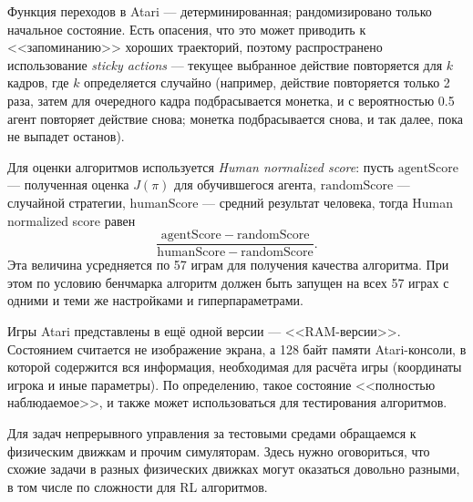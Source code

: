 \begin{example}
Функция переходов в Atari --- детерминированная; рандомизировано только начальное состояние. Есть опасения, что это может приводить к <<запоминанию>> хороших траекторий, поэтому распространено использование \emph{sticky actions} --- текущее выбранное действие повторяется для $k$ кадров, где $k$ определяется случайно (например, действие повторяется только 2 раза, затем для очередного кадра подбрасывается монетка, и с вероятностью 0.5 агент повторяет действие снова; монетка подбрасывается снова, и так далее, пока не выпадет останов).

Для оценки алгоритмов используется \emph{Human normalized score}: пусть $\mathrm{agentScore}$ --- полученная оценка $J(\pi)$ для обучившегося агента, $\mathrm{randomScore}$ --- случайной стратегии, $\mathrm{humanScore}$ --- средний результат человека, тогда Human normalized score равен
$$\frac{\mathrm{agentScore} - \mathrm{randomScore}}{\mathrm{humanScore} - \mathrm{randomScore}}.$$
Эта величина усредняется по 57 играм для получения качества алгоритма. При этом по условию бенчмарка алгоритм должен быть запущен на всех 57 играх с одними и теми же настройками и гиперпараметрами.
\end{example}

\begin{example}
Игры Atari представлены в ещё одной версии --- <<RAM-версии>>. Состоянием считается не изображение экрана, а 128 байт памяти Atari-консоли, в которой содержится вся информация, необходимая для расчёта игры (координаты игрока и иные параметры). По определению, такое состояние <<полностью наблюдаемое>>, и также может использоваться для тестирования алгоритмов.
\end{example}

Для задач непрерывного управления за тестовыми средами обращаемся к физическим движкам и прочим симуляторам. Здесь нужно оговориться, что схожие задачи в разных физических движках могут оказаться довольно разными, в том числе по сложности для RL алгоритмов.

